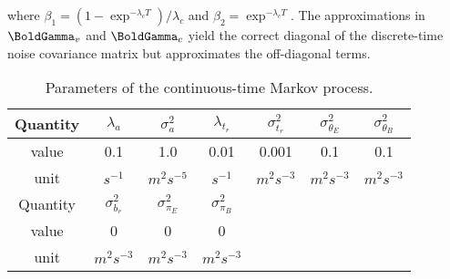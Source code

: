 where $\beta_1 = (1 - \exp^{-\lambda_c T})/ \lambda_c$ and $\beta_2 = \exp^{-\lambda_c T}\!\!.$
The approximations in $\BoldGamma_v$ and $\BoldGamma_c$ yield the correct diagonal of the discrete-time noise covariance matrix but approximates the off-diagonal terms.

\begin{table}[h!]
	\centering
	\begin{tabular}[h]{|c|c|c|c|c|c|c|}
		\hline
		Quantity & 	$\lambda_a$ & $\sigma_a^2$ & $\lambda_{t_r}$ & $\sigma_{t_r}^2$ & $\sigma_{\theta_E}^2$ & $\sigma_{\theta_B}^2$ \T \\ \hline
		value	 &  0.1 & 1.0 & 0.01 & 0.001 & 0.1 & 0.1 \T \\ \hline
		unit	 &  $s^{-1}$ &  $m^2s^{-5}$ & $s^{-1}$ & $m^2s^{-3}$ & $m^2s^{-3}$ & $m^2s^{-3}$ \T \\ \hline
		Quantity & $\sigma_{b_r}^2$ & $\sigma_{\pi_E}^2$ & $\sigma_{\pi_B}^2$  &&& \T \\ \hline
		value	 & 0 & 0 & 0 &&& \T \\ \hline
		unit	 & $m^2s^{-3}$ & $m^2s^{-3}$ & $m^2s^{-3}$ &&&	\T \\ \hline
	\end{tabular}
	\caption{Parameters of the continuous-time Markov process.}
	\label{table:error_std_prediction2}
\end{table}